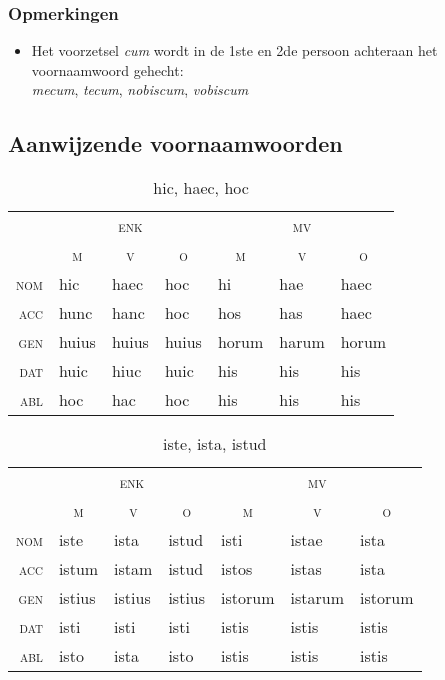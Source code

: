 \documentclass[12pt,a4paper]{article}
\begin{document}
\subsubsection{Opmerkingen}

\begin{itemize}
    \item Het voorzetsel \emph{cum} wordt in de 1ste en 2de persoon achteraan het voornaamwoord gehecht: \\ \emph{mecum}, \emph{tecum}, \emph{nobiscum}, \emph{vobiscum}
\end{itemize}

\subsection{Aanwijzende voornaamwoorden}

\begin{table}[H]
\centering
\begin{tabular}{ r | l l l | l l l }
\toprule
 & \multicolumn{3}{c|}{\textsc{enk}} & \multicolumn{3}{c}{\textsc{mv}} \\
 & \multicolumn{1}{c}{\textsc{m}} & \multicolumn{1}{c}{\textsc{v}} & \multicolumn{1}{c|}{\textsc{o}} & \multicolumn{1}{c}{\textsc{m}} & \multicolumn{1}{c}{\textsc{v}} & \multicolumn{1}{c}{\textsc{o}} \\ 
\midrule
\textsc{nom} & hic   & haec  & hoc   & hi    & hae   & haec  \\
\textsc{acc} & hunc  & hanc  & hoc   & hos   & has   & haec  \\
\textsc{gen} & huius & huius & huius & horum & harum & horum \\
\textsc{dat} & huic  & hiuc  & huic  & his   & his   & his   \\
\textsc{abl} & hoc   & hac   & hoc   & his   & his   & his   \\
\bottomrule
\end{tabular}
\caption{hic, haec, hoc}
\label{tab:hic}
\end{table}

\begin{table}[H]
\centering
\begin{tabular}{ r | l l l | l l l }
\toprule
 & \multicolumn{3}{c|}{\textsc{enk}} & \multicolumn{3}{c}{\textsc{mv}} \\
 & \multicolumn{1}{c}{\textsc{m}} & \multicolumn{1}{c}{\textsc{v}} & \multicolumn{1}{c|}{\textsc{o}} & \multicolumn{1}{c}{\textsc{m}} & \multicolumn{1}{c}{\textsc{v}} & \multicolumn{1}{c}{\textsc{o}} \\ 
\midrule
\textsc{nom} & iste   & ista   & istud  & isti    & istae   & ista  \\
\textsc{acc} & istum  & istam  & istud  & istos   & istas   & ista  \\
\textsc{gen} & istius & istius & istius & istorum & istarum & istorum \\
\textsc{dat} & isti   & isti   & isti   & istis   & istis   & istis   \\
\textsc{abl} & isto   & ista   & isto   & istis   & istis   & istis   \\
\bottomrule
\end{tabular}
\caption{iste, ista, istud}
\label{tab:iste}
\end{table}
\end{document}
